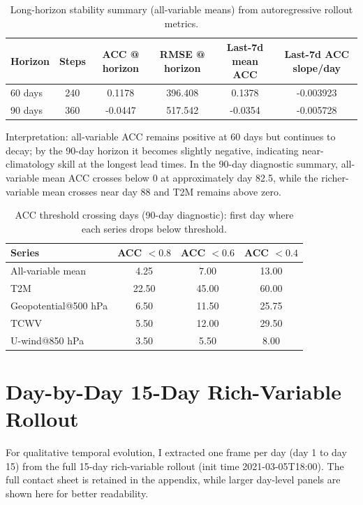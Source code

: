 \documentclass[12pt]{report}
\begin{document}
\begin{table}[H]
\centering
\caption{Long-horizon stability summary (all-variable means) from autoregressive rollout metrics.}
\begin{tabular}{lccccc}
\hline
\textbf{Horizon} & \textbf{Steps} & \textbf{ACC @ horizon} & \textbf{RMSE @ horizon} & \textbf{Last-7d mean ACC} & \textbf{Last-7d ACC slope/day} \\
\hline
60 days & 240 & 0.1178 & 396.408 & 0.1378 & -0.003923 \\
90 days & 360 & -0.0447 & 517.542 & -0.0354 & -0.005728 \\
\hline
\end{tabular}
\end{table}

Interpretation: all-variable ACC remains positive at 60 days but continues to decay; by the 90-day horizon it becomes slightly negative, indicating near-climatology skill at the longest lead times. In the 90-day diagnostic summary, all-variable mean ACC crosses below 0 at approximately day 82.5, while the richer-variable mean crosses near day 88 and T2M remains above zero.

\begin{table}[H]
\centering
\caption{ACC threshold crossing days (90-day diagnostic): first day where each series drops below threshold.}
\begin{tabular}{lccc}
\hline
\textbf{Series} & \textbf{ACC $<0.8$} & \textbf{ACC $<0.6$} & \textbf{ACC $<0.4$} \\
\hline
All-variable mean & 4.25 & 7.00 & 13.00 \\
T2M & 22.50 & 45.00 & 60.00 \\
Geopotential@500 hPa & 6.50 & 11.50 & 25.75 \\
TCWV & 5.50 & 12.00 & 29.50 \\
U-wind@850 hPa & 3.50 & 5.50 & 8.00 \\
\hline
\end{tabular}
\end{table}

\section{Day-by-Day 15-Day Rich-Variable Rollout}

For qualitative temporal evolution, I extracted one frame per day (day 1 to day 15) from the full 15-day rich-variable rollout (init time 2021-03-05T18:00). The full contact sheet is retained in the appendix, while larger day-level panels are shown here for better readability.
\end{document}

